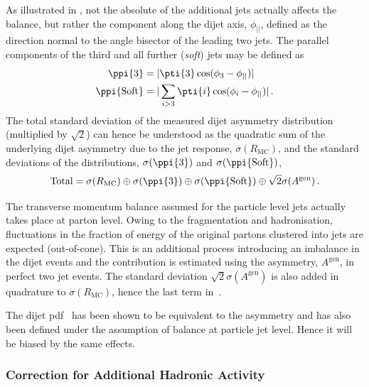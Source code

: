 As illustrated in , not the
absolute \pt of the additional jets actually affects the balance, but rather the component along the dijet axis, $\phi_{||}$, defined as the direction normal to the angle bisector of the leading two jets.
The parallel \pt components of the third and all further
(\textit{soft}) jets may be defined as
\begin{align}
  \begin{split}
    \ppi{3}               & =  |\pti{3}\cos(\phi_{3}-\phi_{||})| \\
    \ppi{\text{Soft}} & =  |\sum_{i>3}\pti{i}\cos(\phi_{i}-\phi_{||})| \,.
  \end{split}
\end{align}
The total standard deviation of the measured dijet asymmetry
distribution (multiplied by $\sqrt{2}$) can hence be understood as the
quadratic sum of the underlying dijet asymmetry due to the jet \pt response,
$\sigma(R_{\text{MC}})$, and the standard deviations of the \pp
distributions, $\sigma(\ppi{3})$ and
$\sigma(\ppi{\text{Soft}})$,
\begin{equation}
  \label{eq:ResFit:TotalAsym}
  \text{Total} = \sigma(R_{\text{MC}}) \oplus \sigma(\ppi{3}) \oplus
  \sigma(\ppi{\text{Soft}}) \oplus \sqrt{2}\sigma(A^{\text{gen}}) \,.
\end{equation}

The transverse momentum balance assumed for the particle level jets
actually takes place at parton level.
Owing to the fragmentation and hadronisation, fluctuations in the
fraction of energy of the original partons clustered into jets are
expected (out-of-cone).
This is an additional process introducing an imbalance in the
dijet events and the contribution is estimated using the \ptgen
asymmetry, $A^{\text{gen}}$, in perfect
two jet events.
The standard deviation $\sqrt{2}\sigma(A^{\text{gen}})$ is also added in quadrature to
$\sigma(R_{\text{MC}})$, hence the last term in~.

The dijet pdf~ has been shown to be equivalent
to the asymmetry and has also been defined under the assumption of \pt
balance at particle jet level.
Hence it will be biased by the same effects.



\subsubsection{Correction for Additional Hadronic Activity}\label{sec:ResFit:AddJets:Extrapolation}

